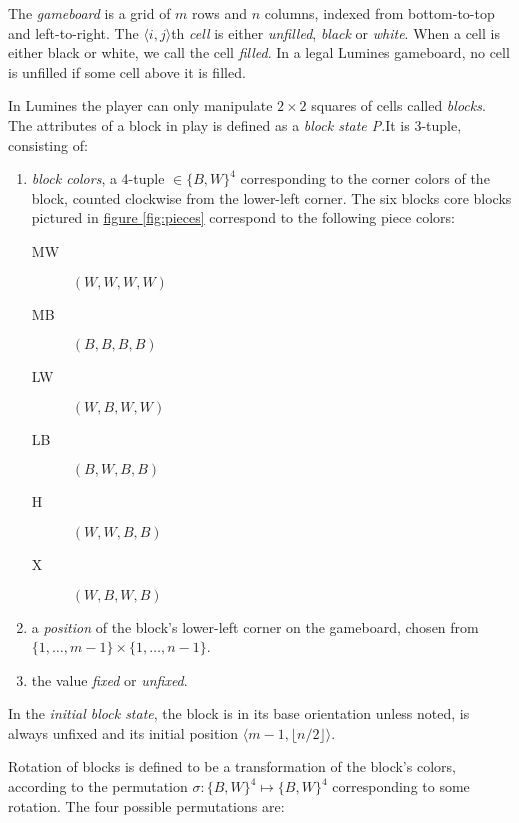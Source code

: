 \begin{description}[style=unboxed, leftmargin=0cm,labelsep=1em]
    \item[The gameboard] The \emph{gameboard} is a grid of $m$ rows and $n$ columns, indexed from bottom-to-top and left-to-right. The $\langle i,j \rangle$th \emph{cell} is either \emph{unfilled}, \emph{black} or \emph{white}. When a cell is either black or white, we call the cell \emph{filled}. In a legal Lumines gameboard, no cell is unfilled if some cell above it is filled.

    \item[Game blocks] In Lumines the player can only manipulate $2 \times 2$ squares of cells called \textit{blocks}. The attributes of a block in play is defined as a \emph{block state P}.It is 3-tuple, consisting of: 
    \begin{enumerate}
        \item \emph{block colors}, a 4-tuple $\in \{B,W\}^4$ corresponding to the corner colors of the block, counted clockwise from the lower-left corner. The six blocks core blocks pictured in \hyperref[fig:pieces]{figure \ref*{fig:pieces}} correspond to the following piece colors:

        \begin{description}
            \item[MW] $(W,W,W,W)$
            \item[MB] $(B,B,B,B)$
            \item[LW] $(W,B,W,W)$
            \item[LB] $(B,W,B,B)$
            \item[H] $(W,W,B,B)$
            \item[X] $(W,B,W,B)$
        \end{description}

        \item a \emph{position} of the block's lower-left corner on the gameboard, chosen from $\{1, \ldots, m-1\} \times \{1, \ldots, n-1\}$.
        \item the value \emph{fixed} or \emph{unfixed}.
    \end{enumerate}

In the \textit{initial block state}, the block is in its base orientation unless noted, is always unfixed and its initial position $\langle m-1, \lfloor n/2 \rfloor \rangle$.

    \item[Rotating blocks] Rotation of blocks is defined to be a transformation of the block's colors, according to the permutation $\sigma: \{B,W\}^4 \mapsto \{B,W\}^4$ corresponding to some rotation. The four possible permutations are:


\end{description}
